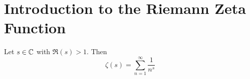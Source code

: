 \section{Introduction to the Riemann Zeta Function}

\begin{definition}
	Let $s\in\mathbb{C}$ with $\Re(s)>1$. Then \[
	\zeta(s)=\sum_{n=1}^{\infty}\frac{1}{n^s}
	\]
\end{definition}